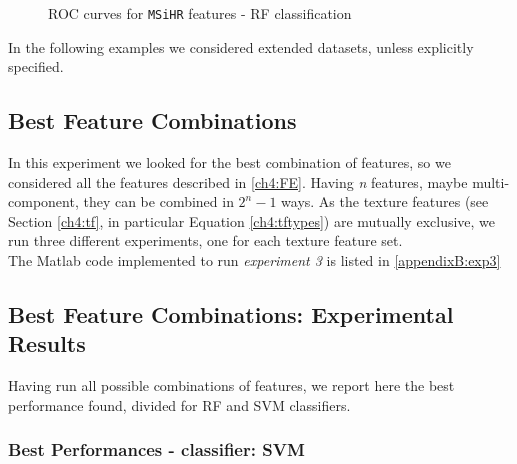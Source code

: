 \begin{figure}[!htb]
    \caption{ROC curves for \texttt{MSiHR} features - RF classification}
    \label{ch6:fig5}
\end{figure}


In the following examples we considered extended datasets, unless explicitly specified.


\vspace{0.5cm}

\subsection{Best Feature Combinations}

In this experiment we looked for the best combination of features, so we considered all the features described in \ref{ch4:FE}. Having \textit{n} features, maybe multi-component,
they can be combined in $2^n-1$ ways. As the texture features (see Section \ref{ch4:tf}, in particular Equation \ref{ch4:tftypes}) are mutually exclusive, we run three different
experiments, one for each texture feature set.
\\
The Matlab code implemented to run \textit{experiment 3} is listed in \ref{appendixB:exp3}

\vspace{0.5cm}


\subsection{Best Feature Combinations: Experimental Results}


Having run all possible combinations of features, we report here the best performance found, divided for \Gls{RF} and \Gls{SVM} classifiers.

\vspace{0.5cm}

\subsubsection{Best Performances - classifier: SVM}

